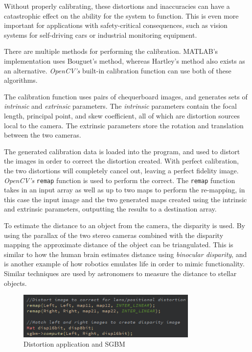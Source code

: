 \documentclass[conference]{IEEEtran}
\begin{document}
Without properly calibrating, these distortions and inaccuracies can have a catastrophic effect on the ability for the system to function. This is even more important for applications with safety-critical consequences, such as vision systems for self-driving cars\cite{Bosch} or industrial monitoring equipment\cite{Intel}.

There are multiple methods for performing the calibration. MATLAB's implementation uses Bouguet's method\cite{MATLAB_Calibration}\cite{Bouguet}, whereas Hartley's method\cite{hartley2003multiple} also exists as an alternative. \textit{OpenCV's} built-in calibration function can use both of these algorithms\cite{Book_Calibration}.

The calibration function uses pairs of chequerboard images, and generates sets of \textit{intrinsic} and \textit{extrinsic} parameters. The \textit{intrinsic} parameters contain the focal length, principal point, and skew coefficient, all of which are distortion sources local to the camera. The extrinsic parameters store the rotation and translation between the two cameras. 

The generated calibration data is loaded into the program, and used to distort the images in order to correct the distortion created. With perfect calibration, the two distortions will completely cancel out, leaving a perfect fidelity image. \textit{OpenCV's} \verb|remap|\cite{remap} function is used to perform the correct. The \verb|remap| function takes in an input array as well as up to two maps to perform the re-mapping, in this case the input image and the two generated maps created using the intrinsic and extrinsic parameters, outputting the results to a destination array\cite{remap_docs}.

To estimate the distance to an object from the camera, the disparity is used. By using the parallax of the two stereo cameras combined with the disparity mapping the approximate distance of the object can be triangulated. This is similar to how the human brain estimates distance using \textit{binocular disparity}\cite{10.3389/fpsyg.2014.00870}\cite{BERRYHILL2012525}, and is another example of how robotics emulates life in order to mimic functionality. Similar techniques are used by astronomers to measure the distance to stellar objects\cite{parallax}.

\begin{figure}[H]
\centering
\includegraphics[width=3.5in]{t4_sgbm}
\caption{Distortion application and SGBM}
\label{fig:t4_sgbm}
\end{figure}
\end{document}
